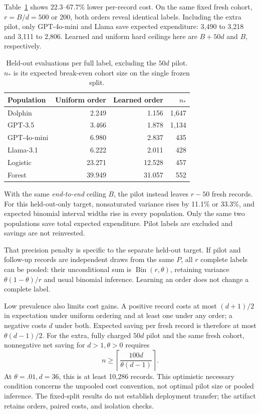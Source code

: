 \documentclass[conference]{IEEEtran}
\DeclareMathOperator{\Bin}{Bin}
\begin{document}
Table~\ref{tab:ordering} shows 22.3--67.7\% lower per-record cost. On the same fixed fresh cohort, $r=B/d=500$ or 200, both orders reveal identical labels. Including the extra pilot, only GPT-4o-mini and Llama save expected expenditure: 3,490 to 3,218 and 3,111 to 2,806. Learned and uniform hard ceilings here are $B+50d$ and $B$, respectively.

\begin{table}[t]
\caption{Held-out evaluations per full label, excluding the $50d$ pilot. $n_*$ is its expected break-even cohort size on the single frozen split.}\label{tab:ordering}
\centering
\begin{tabular}{lrrr}
\toprule
Population&Uniform order&Learned order&$n_*$\\
\midrule
Dolphin&2.249&1.156&1,647\\
GPT-3.5&3.466&1.878&1,134\\
GPT-4o-mini&6.980&2.837&435\\
Llama-3.1&6.222&2.011&428\\
Logistic&23.271&12.528&457\\
Forest&39.949&31.057&552\\
\bottomrule
\end{tabular}
\end{table}

With the same \emph{end-to-end} ceiling $B$, the pilot instead leaves $r-50$ fresh records. For this held-out-only target, nonsaturated variance rises by 11.1\% or 33.3\%, and expected binomial interval widths rise in every population. Only the same two populations save total expected expenditure. Pilot labels are excluded and savings are not reinvested.

That precision penalty is specific to the separate held-out target. If pilot and follow-up records are independent draws from the same $P$, all $r$ complete labels can be pooled: their unconditional sum is $\Bin(r,\theta)$, retaining variance $\theta(1-\theta)/r$ and usual binomial inference. Learning an order does not change a complete label.

Low prevalence also limits cost gains. A positive record costs at most $(d+1)/2$ in expectation under uniform ordering and at least one under any order; a negative costs $d$ under both. Expected saving per fresh record is therefore at most $\theta(d-1)/2$. For the extra, fully charged $50d$ pilot and the same fresh cohort, nonnegative net saving for $d>1,\theta>0$ requires
\[
 n\geq\left\lceil\frac{100d}{\theta(d-1)}\right\rceil.
\]
At $\theta=.01,d=36$, this is at least 10,286 records. This optimistic necessary condition concerns the unpooled cost convention, not optimal pilot size or pooled inference. The fixed-split results do not establish deployment transfer; the artifact retains orders, paired costs, and isolation checks.
\end{document}
